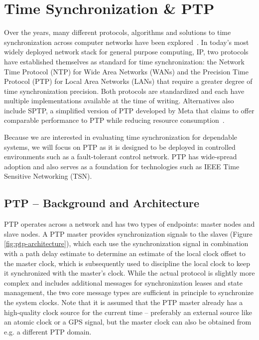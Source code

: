 
\section{Time Synchronization \& PTP}

Over the years, many different protocols, algorithms and solutions to time synchronization across computer networks have been explored~\cite{ntpv4-spec, sntp-spec, linuxptp}. In today's most widely deployed network stack for general purpose computing, IP, two protocols have established themselves as standard for time synchronization: the Network Time Protocol (NTP) for Wide Area Networks (WANs) and the Precision Time Protocol (PTP) for Local Area Networks (LANs) that require a greater degree of time synchronization precision. Both protocols are standardized and each have multiple implementations available at the time of writing. Alternatives also include SPTP, a simplified version of PTP developed by Meta that claims to offer comparable performance to PTP while reducing resource consumption~\cite{sptp}.

Because we are interested in evaluating time synchronization for dependable systems, we will focus on PTP as it is designed to be deployed in controlled environments such as a fault-tolerant control network. PTP has wide-spread adoption and also serves as a foundation for technologies such as IEEE Time Sensitive Networking (TSN).


\subsection{PTP -- Background and Architecture}

PTP operates across a network and has two types of endpoints: master nodes and slave nodes. A PTP master provides synchronization signals to the slaves (Figure \ref{fig:ptp-architecture}), which each use the synchronization signal in combination with a path delay estimate to determine an estimate of the local clock offset to the master clock, which is subsequently used to discipline the local clock to keep it synchronized with the master's clock. While the actual protocol is slightly more complex and includes additional messages for synchronization leases and state management, the two core message types are sufficient in principle to synchronize the system clocks. Note that it is assumed that the PTP master already has a high-quality clock source for the current time -- preferably an external source like an atomic clock or a GPS signal, but the master clock can also be obtained from e.g. a different PTP domain.


